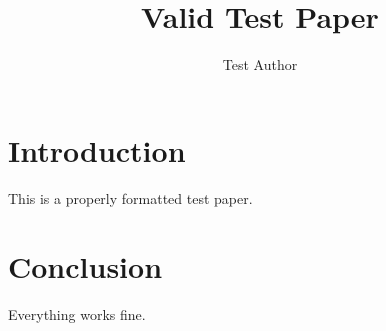 \documentclass{article}
\begin{document}
\title{Valid Test Paper}
\author{Test Author}
\maketitle

\section{Introduction}
This is a properly formatted test paper.

\section{Conclusion}
Everything works fine.
\end{document}
